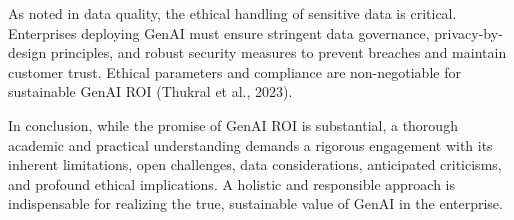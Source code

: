\documentclass[10pt,twocolumn,letterpaper]{article}
\begin{document}
As noted in data quality, the ethical handling of sensitive data is critical. Enterprises deploying GenAI must ensure stringent data governance, privacy-by-design principles, and robust security measures to prevent breaches and maintain customer trust. Ethical parameters and compliance are non-negotiable for sustainable GenAI ROI (Thukral et al., 2023).

In conclusion, while the promise of GenAI ROI is substantial, a thorough academic and practical understanding demands a rigorous engagement with its inherent limitations, open challenges, data considerations, anticipated criticisms, and profound ethical implications. A holistic and responsible approach is indispensable for realizing the true, sustainable value of GenAI in the enterprise.

\


\par\vspace{0.5em}



\end{document}
